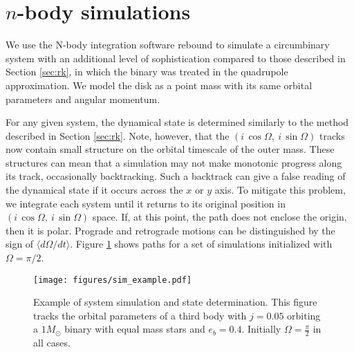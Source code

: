 \documentclass[twocolumn,linenumbers]{aastex631}
\begin{document}
\section{$n$-body simulations}
\label{sec:reb}

We use the N-body integration software {\sc rebound} \citep{rebound} to simulate a circumbinary system with an additional level of sophistication compared to those described in Section \ref{sec:rk}, in which the binary was treated in the quadrupole approximation. We model the disk as a point mass with its same orbital parameters and angular momentum.

For any given system, the dynamical state is determined similarly to the method described in Section \ref{sec:rk}. Note, however, that the $(i\,\cos{\Omega},~i\,\sin{\Omega})$ tracks now contain small structure on the orbital timescale of the outer mass. These structures can mean that a simulation may not make monotonic progress along its track, occasionally backtracking. Such a backtrack can give a false reading of the dynamical state if it occurs across the $x$ or $y$ axis. To mitigate this problem, we integrate each system until it returns to its original position in $(i\,\cos{\Omega},~i\,\sin{\Omega})$ space. If, at this point, the path does not enclose the origin, then it is polar. Prograde and retrograde motions can be distinguished by the sign of $\langle d\Omega/dt \rangle$. Figure \ref{fig:sim_example} shows paths for a set of simulations initialized with $\Omega = \pi/2$.

\begin{figure}
    \begin{centering}
        \texttt{[image: figures/sim\_example.pdf]}
        \caption{Example of system simulation and state determination. This figure tracks the orbital parameters
        of a third body with $j=0.05$ orbiting a $1 M_\odot$ binary with equal mass stars and $e_b = 0.4$.
        Initially $\Omega = \frac{\pi}{2}$ in all cases.}
        \label{fig:sim_example}
    \end{centering}
\end{figure}
\end{document}
